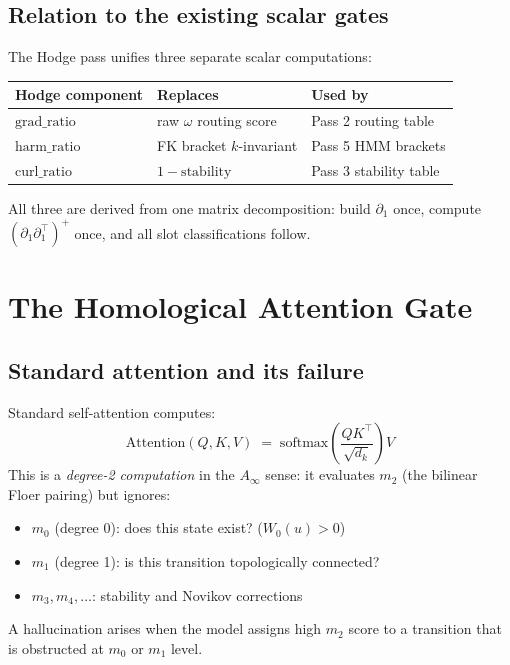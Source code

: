 \documentclass[11pt,a4paper]{article}
\begin{document}
\subsection{Relation to the existing scalar gates}

The Hodge pass unifies three separate scalar computations:

\begin{center}
\renewcommand{\arraystretch}{1.3}
\begin{tabular}{lll}
\toprule
Hodge component & Replaces & Used by \\
\midrule
$\mathrm{grad\_ratio}$ & raw $\omega$ routing score & Pass 2 routing table \\
$\mathrm{harm\_ratio}$ & FK bracket $k$-invariant & Pass 5 HMM brackets \\
$\mathrm{curl\_ratio}$ & $1 - \mathrm{stability}$ & Pass 3 stability table \\
\bottomrule
\end{tabular}
\end{center}

All three are derived from one matrix decomposition: build
$\partial_1$ once, compute $(\partial_1\partial_1^\top)^+$ once,
and all slot classifications follow.

\section{The Homological Attention Gate}

\subsection{Standard attention and its failure}

Standard self-attention computes:
\[
  \mathrm{Attention}(Q,K,V)
  \;=\; \mathrm{softmax}\!\left(\frac{QK^\top}{\sqrt{d_k}}\right) V
\]
This is a \emph{degree-2 computation} in the $A_\infty$ sense:
it evaluates $m_2$ (the bilinear Floer pairing) but ignores:
\begin{itemize}
  \item $m_0$ (degree 0): does this state exist? ($W_0(u) > 0$)
  \item $m_1$ (degree 1): is this transition topologically connected?
  \item $m_3, m_4, \ldots$: stability and Novikov corrections
\end{itemize}
A hallucination arises when the model assigns high $m_2$ score
to a transition that is obstructed at $m_0$ or $m_1$ level.
\end{document}
